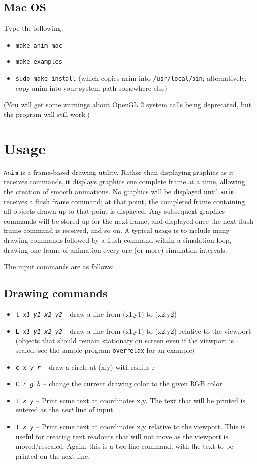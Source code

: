 \documentclass[12pt]{article}
\begin{document}
\subsection{Mac OS}

Type the following:

\begin{itemize}
  \item {\tt make anim-mac}
  \item {\tt make examples}
  \item {\tt sudo make install} (which copies anim into {\tt /usr/local/bin}; alternatively, copy anim into your system path somewhere else)
\end{itemize}

(You will get some warnings about OpenGL 2 system calls being deprecated, but the program will still work.)

\section{Usage}

{\tt Anim} is a frame-based drawing utility. Rather than displaying graphics as it receives commands,
it displays graphics one complete frame at a time, allowing the creation of smooth animations. No graphics
will be displayed until {\tt anim} receives a flush frame command; at that point, the completed frame containing
all objects drawn up to that point is 
displayed. Any subsequent graphics commands will be stored up for the next frame, and displayed once
the next flush frame command is received, and so on. A typical usage is to include many drawing commands
followed by a flush command within a simulation loop, drawing one frame of animation every one (or more) 
simulation intervals.

The input commands are as follows:

\subsection {Drawing commands}
\begin{itemize}
\item {\tt l {\it x1 y1 x2 y2}} -- draw a line from (x1,y1) to (x2,y2)
\item {\tt L {\it x1 y1 x2 y2}} -- draw a line from (x1,y1) to (x2,y2) relative to the viewport (objects that should remain stationary on screen even if the viewport is scaled; see the sample program {\tt overrelax} for an example)
\item {\tt c {\it x y r}} -- draw a circle at (x,y) with radius r
\item {\tt C {\it r g b}} -- change the current drawing color to the given RGB color
\item {\tt t {\it x y}} -- Print some text at coordinates x,y. The text that will be printed is entered as the {\it next} line of input.
\item {\tt T {\it x y}} -- Print some text at coordinates x,y relative to the viewport. This is useful for creating text readouts that will not move as the viewport is moved/rescaled. Again, this is a two-line command, with the text to be printed on the next line.
\end{itemize}
\end{document}

